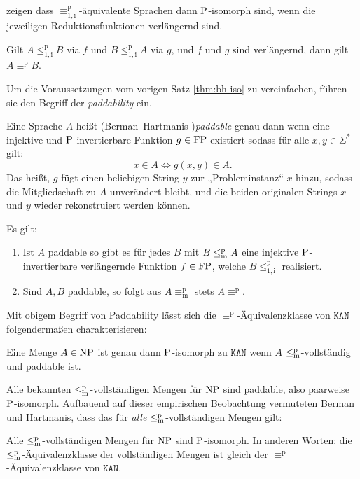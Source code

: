 \textcite{berman_isomorphisms_1977} zeigen dass $\equiv_\mathrm{1,i}^\mathrm{p}$-äquivalente Sprachen dann $\P$-isomorph sind, wenn die jeweiligen Reduktionsfunktionen verlängernd sind.
\begin{theorem}\label{thm:bh-iso}
    Gilt $A\leq_\mathrm{1,i}^\mathrm{p} B$ via $f$ und $B\leq_\mathrm{1,i}^\mathrm{p} A$ via $g$, und $f$ und $g$ sind verlängernd, dann gilt $A\equiv^\mathrm{p}B$.
\end{theorem}
Um die Voraussetzungen vom vorigen Satz \ref{thm:bh-iso} zu vereinfachen, führen sie den Begriff der \emph{paddability} ein.
\begin{definition}
    Eine Sprache $A$ heißt (Berman–Hartmanis-)\emph{paddable} genau dann wenn eine injektive und $\P$-invertierbare Funktion $g\in \FP$ existiert sodass für alle $x,y\in\Sigma^*$ gilt:
    \[ x\in A \iff g(x,y)\in A. \]
    Das heißt, $g$ fügt einen beliebigen String $y$ zur „Probleminstanz“ $x$ hinzu, sodass die Mitgliedschaft zu $A$ unverändert bleibt, und die beiden originalen Strings $x$ und $y$ wieder rekonstruiert werden können. 
\end{definition}
Es gilt:
\begin{theorem}
    \begin{enumerate}
        \item Ist $A$ paddable so gibt es für jedes $B$ mit $B\leqmp A$ eine injektive $\P$-invertierbare verlängernde Funktion $f\in\FP$, welche $B\leq_\mathrm{1,i}^\mathrm{p}$ realisiert.
        \item Sind $A, B$ paddable, so folgt aus $A\equiv_\mathrm{m}^\mathrm{p}$ stets $A\equiv^\mathrm{p}$.
    \end{enumerate}
\end{theorem}
Mit obigem Begriff von Paddability lässt sich die $\equiv^\mathrm{p}$-Äquivalenzklasse von $\mathtt{KAN}$ folgendermaßen charakterisieren:
\begin{theorem}
    Eine Menge $A\in\NP$ ist genau dann $\P$-isomorph zu $\mathtt{KAN}$ wenn $A$ $\leqmp$-vollständig und paddable ist.
\end{theorem}
Alle bekannten $\leqmp$-vollständigen Mengen für $\NP$ sind paddable, also paarweise $\P$-isomorph. 
Aufbauend auf dieser empirischen Beobachtung vermuteten Berman und Hartmanis, dass das für \emph{alle} $\leqmp$-vollständigen Mengen gilt:
\begin{conjecture}[$\mathsf{IC}$]
    Alle $\leqmp$-vollständigen Mengen für $\NP$ sind $\P$-isomorph.
    In anderen Worten: die $\leqmp$-Äquivalenzklasse der vollständigen Mengen ist gleich der  $\equiv^\mathrm{p}$-Äquivalenzklasse von $\mathtt{KAN}$.
\end{conjecture}

